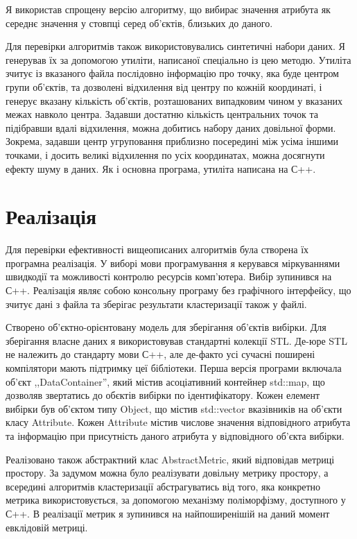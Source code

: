         Я використав спрощену версію алгоритму, що вибирає значення атрибута як середнє значення у стовпці серед об'єктів, близьких до даного.
        
        Для перевірки алгоритмів також використовувались синтетичні набори даних. Я генерував їх за допомогою утиліти, написаної спеціально із цею методю. Утиліта зчитує із вказаного файла послідовно інформацію про точку, яка буде центром групи об'єктів, та дозволені відхилення від центру по кожній координаті, і генерує вказану кількість об'єктів, розташованих випадковим чином у вказаних межах навколо центра. Задавши достатню кількість центральних точок та підібравши вдалі відхилення, можна добитись набору даних довільної форми. Зокрема, задавши центр угруповання приблизно посередині між усіма іншими точками, і досить великі відхилення по усіх координатах, можна досягнути ефекту шуму в даних. Як і основна програма, утиліта написана на С++.
            
    \section {Реалізація}
        Для перевірки ефективності вищеописаних алгоритмів була створена їх програмна реалізація. У виборі мови програмування я керувався міркуваннями швидкодії та можливості контролю ресурсів комп'ютера. Вибір зупинився на С++. Реалізація являє собою консольну програму без графічного інтерфейсу, що зчитує дані з файла та зберігає результати кластеризації також у файлі.
        
        Створено об'єктно-орієнтовану модель для зберігання об'єктів вибірки. Для зберігання власне даних я використовував стандартні колекції STL. Де-юре STL не належить до стандарту мови С++, але де-факто усі сучасні поширені компілятори мають підтримку цеї бібліотеки. Перша версія програми включала об'єкт ,,DataContainer'', який містив асоціативний контейнер std::map, що дозволяв звертатись до обєктів вибірки по ідентифікатору. Кожен елемент вибірки був об'єктом типу Object, що містив std::vector вказівників на об'єкти класу Attribute. Кожен Attribute містив числове значення відповідного атрибута та інформацію при присутність даного атрибута у відповідного об'єкта вибірки.
        
        Реалізовано також абстрактний клас AbstractMetric, який відповідав метриці простору. За задумом можна було реалізувати довільну метрику простору, а всередині алгоритмів кластеризації абстрагуватись від того, яка конкретно метрика використовується, за допомогою механізму поліморфізму, доступного у С++. В реалізації метрик я зупинився на найпоширенішій на даний момент евклідовій метриці.
        

